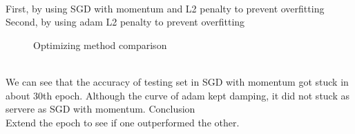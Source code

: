 \documentclass[11pt, a4paper]{article} %
\begin{document}
\\ First, by using SGD with momentum and L2 penalty to prevent overfitting
\\ Second, by using adam L2 penalty to prevent overfitting
\begin{figure}[H]
    \centering
    \hfill
    \caption{Optimizing method comparison}
    \label{fig:my_label}
\end{figure}
\\ We can see that the accuracy of testing set in SGD with momentum got stuck in about 30th epoch. Although the curve of adam kept damping, it did not stuck as servere as SGD with momentum. \newline \break 
{\Large Conclusion}
\\ Extend the epoch to see if one outperformed the other.
\end{document}
